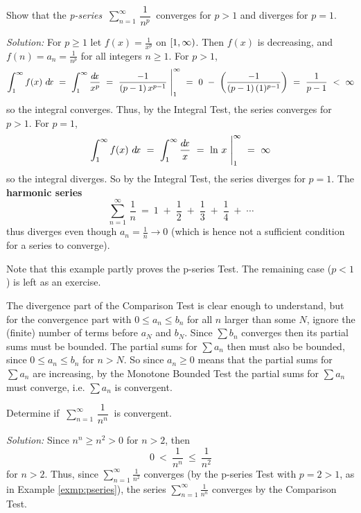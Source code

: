 \begin{exmp}\label{exmp:pseries}
\noindent Show that the \emph{p-series}
$~\displaystyle\sum_{n=1}^{\infty} \,\dfrac{1}{n^p}~$
converges for $p>1$ and diverges for $p=1$.\vspace{1mm}
\par\noindent\emph{Solution:} For $p \ge 1$ let $f(x) = \frac{1}{x^p}$ on
$\lbrack 1,\infty )$. Then $f(x)$ is decreasing, and $f(n) = a_n = \frac{1}{n^p}$
for all integers $n\ge 1$. For $p > 1$,
\[
\int_1^{\infty} f(x)~d\!x ~=~ \int_1^{\infty} \frac{d\!x}{x^p} ~=~
\frac{-1}{(p-1)\,x^{p-1}}~\Biggr|_1^{\infty} ~=~ 0 ~-~
\left(\frac{-1}{(p-1)\,(1)^{p-1}}\right) ~=~ \frac{1}{p-1} ~<~ \infty
\]
so the integral converges. Thus, by the Integral Test, the series converges for
$p>1$. For $p=1$,
\[
\int_1^{\infty} f(x)~d\!x ~=~ \int_1^{\infty} \frac{d\!x}{x} ~=~
\ln\,x~\Biggr|_1^{\infty} ~=~ \infty
\]
so the integral diverges. So by the Integral Test, the series diverges for
$p=1$. The \textbf{harmonic series}
\[
\sum_{n=1}^{\infty} \,\frac{1}{n} ~=~ 1 \;+\; \frac{1}{2} \;+\; \frac{1}{3}
\;+\; \frac{1}{4} \;+\; \cdots
\]
thus diverges even though $a_n = \frac{1}{n} \rightarrow 0$ (which is hence not
a sufficient condition for a series to converge).\vspace{1mm}

\noindent Note that this example partly proves the p-series Test. The remaining
case ($p < 1$) is left as an exercise.
\end{exmp}
\divider
\newpage
The divergence part of the Comparison Test is clear enough to understand, but
for the convergence part with $0 \le a_n \le b_n$ for all $n$ larger than some
$N$, ignore the (finite) number of terms before $a_N$ and $b_N$. Since
$\sum b_n$ converges then its partial sums must be bounded. The partial sums for
$\sum a_n$ then must also be bounded, since $0 \le a_n \le b_n$ for $n > N$. So
since $a_n \ge 0$ means that the partial sums for $\sum a_n$ are increasing, by
the Monotone Bounded Test the partial sums for $\sum a_n$ must converge, i.e.
$\sum a_n$ is convergent.

\begin{exmp}
\noindent Determine if $~\displaystyle\sum_{n=1}^{\infty} \,\dfrac{1}{n^n}~$ is
convergent.\vspace{1mm}
\par\noindent\emph{Solution:} Since $n^n \ge n^2 > 0$ for $n > 2$, then
\[
0 ~<~ \frac{1}{n^n} ~\le~ \frac{1}{n^2}
\]
for $n > 2$. Thus, since $\sum_{n=1}^{\infty} \frac{1}{n^2}$ converges (by the
p-series Test with $p=2>1$, as in Example \ref{exmp:pseries}), the series
$\sum_{n=1}^{\infty} \frac{1}{n^n}$ converges by the Comparison Test.
\end{exmp}
\divider
\vspace{2mm}

